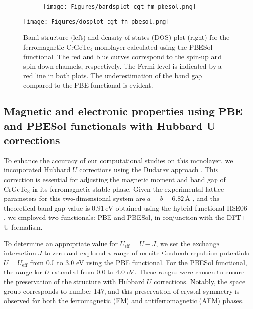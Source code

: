 \begin{figure}[H]
	\begin{subfigure}{.5\textwidth}
		\centering
		\texttt{[image: Figures/bandsplot\_cgt\_fm\_pbesol.png]}		
	\end{subfigure}%
	\begin{minipage}{.5\textwidth}
		\vspace{-12.4cm}
		\centering
		\texttt{[image: Figures/dosplot\_cgt\_fm\_pbesol.png]}
		\captionsetup{justification=centering}
	\end{minipage}
	\caption{Band structure (left) and density of states (DOS) plot (right) for the ferromagnetic CrGeTe$_{3}$ monolayer calculated using the PBESol functional. The red and blue curves correspond to the spin-up and spin-down channels, respectively. The Fermi level is indicated by a red line in both plots. The underestimation of the band gap compared to the PBE functional is evident.}
\label{fig:4.6}
\end{figure}




\subsection{Magnetic and electronic properties using PBE and PBESol functionals with  Hubbard U corrections}

To enhance the accuracy of our computational studies on this monolayer, we incorporated Hubbard $U$ corrections using the Dudarev approach \supercite{Dudarev1998}. This correction is essential for adjusting the magnetic moment and band gap of CrGeTe$_3$ in its ferromagnetic stable phase. Given the experimental lattice parameters for this two-dimensional system are $a=b=6.82\, \text{\AA}$ \supercite{Gong2017}, and the theoretical band gap value is $0.91\, \text{eV}$ \supercite{Wang2019} obtained using the hybrid functional HSE06 \supercite{Krukau2006}, we employed two functionals: PBE and PBESol, in conjunction with the DFT$+$U formalism.

To determine an appropriate value for $U_{\text{eff}} = U - J$, we set the exchange interaction $J$ to zero and explored a range of on-site Coulomb repulsion potentials $U = U_{\text{eff}}$ from 0.0 to 3.0 eV using the PBE functional. For the PBESol functional, the range for $U$ extended from 0.0 to 4.0 eV. These ranges were chosen to ensure the preservation of the structure with Hubbard $U$ corrections. Notably, the space group corresponds to number 147, and this preservation of crystal symmetry is observed for both the ferromagnetic (FM) and antiferromagnetic (AFM) phases.

